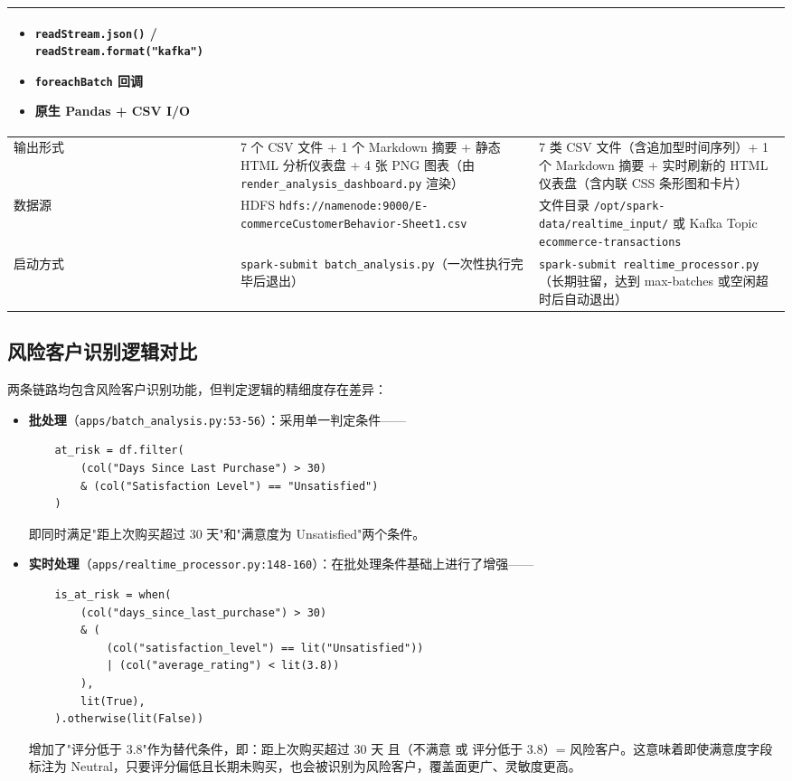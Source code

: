 \documentclass[12pt,hyperref,a4paper,UTF8]{ctexart}
\begin{document}
\begin{longtable}{p{2.4cm}p{5.2cm}p{5.2cm}}
\begin{itemize}
    \item \texttt{readStream.json()} / \texttt{readStream.format("kafka")}
    \item \texttt{foreachBatch} 回调
    \item 原生 Pandas + CSV I/O
\end{itemize} \\
\midrule
输出形式 & 7 个 CSV 文件 + 1 个 Markdown 摘要 + 静态 HTML 分析仪表盘 + 4 张 PNG 图表（由 \texttt{render\_analysis\_dashboard.py} 渲染） & 7 类 CSV 文件（含追加型时间序列）+ 1 个 Markdown 摘要 + 实时刷新的 HTML 仪表盘（含内联 CSS 条形图和卡片） \\
\midrule
数据源 & HDFS \texttt{hdfs://namenode:9000/E-commerceCustomerBehavior-Sheet1.csv} & 文件目录 \texttt{/opt/spark-data/realtime\_input/} 或 Kafka Topic \texttt{ecommerce-transactions} \\
\midrule
启动方式 & \texttt{spark-submit batch\_analysis.py}（一次性执行完毕后退出） & \texttt{spark-submit realtime\_processor.py}（长期驻留，达到 max-batches 或空闲超时后自动退出） \\
\bottomrule
\end{longtable}

\subsection{风险客户识别逻辑对比}

两条链路均包含风险客户识别功能，但判定逻辑的精细度存在差异：

\begin{itemize}
    \item \textbf{批处理}（\texttt{apps/batch\_analysis.py:53-56}）：采用单一判定条件——
    \begin{verbatim}
    at_risk = df.filter(
        (col("Days Since Last Purchase") > 30)
        & (col("Satisfaction Level") == "Unsatisfied")
    )
    \end{verbatim}
    即同时满足"距上次购买超过 30 天"和"满意度为 Unsatisfied"两个条件。

    \item \textbf{实时处理}（\texttt{apps/realtime\_processor.py:148-160}）：在批处理条件基础上进行了增强——
    \begin{verbatim}
    is_at_risk = when(
        (col("days_since_last_purchase") > 30)
        & (
            (col("satisfaction_level") == lit("Unsatisfied"))
            | (col("average_rating") < lit(3.8))
        ),
        lit(True),
    ).otherwise(lit(False))
    \end{verbatim}
    增加了"评分低于 3.8"作为替代条件，即：距上次购买超过 30 天 且（不满意 或 评分低于 3.8）= 风险客户。这意味着即使满意度字段标注为 Neutral，只要评分偏低且长期未购买，也会被识别为风险客户，覆盖面更广、灵敏度更高。
\end{itemize}
\end{document}

